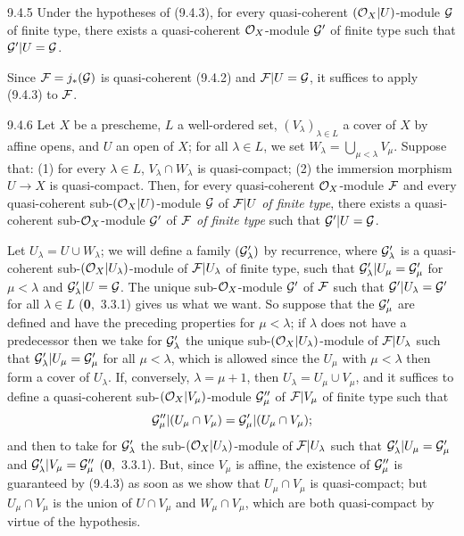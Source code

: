 \documentclass[../main.tex]{subfiles}
\begin{document}
 \begin{env}[Corollary]{9.4.5}
     Under the hypotheses of (9.4.3), for every quasi-coherent $(\mathcal{O}_X|U)$-module $\mathcal{G}$ of finite type, there exists a quasi-coherent $\mathcal{O}_X$-module $\mathcal{G}'$ of finite type such that $\mathcal{G}'|U=\mathcal{G}$.
 \end{env}
 
 Since $\mathcal{F}=j_*(\mathcal{G})$ is quasi-coherent (9.4.2) and $\mathcal{F}|U=\mathcal{G}$, it suffices to apply (9.4.3) to $\mathcal{F}$.
 
 \begin{env}[Lemma]{9.4.6}
     Let $X$ be a prescheme, $L$ a well-ordered set, $(V_\lambda)_{\lambda\in L}$ a cover of $X$ by affine opens, and $U$ an open of $X$; for all $\lambda\in L$, we set $W_\lambda=\bigcup_{\mu<\lambda}V_\mu$.
     Suppose that: (1) for every $\lambda\in L$, $V_\lambda\cap W_\lambda$ is quasi-compact; (2) the immersion morphism $U\to X$ is quasi-compact.
     Then, for every quasi-coherent $\mathcal{O}_X$-module $\mathcal{F}$ and every quasi-coherent sub-$(\mathcal{O}_X|U)$-module $\mathcal{G}$ of $\mathcal{F}|U$ \emph{of finite type}, there exists a quasi-coherent sub-$\mathcal{O}_X$-module $\mathcal{G}'$ of $\mathcal{F}$ \emph{of finite type} such that $\mathcal{G}'|U=\mathcal{G}$.
 \end{env}
 
 Let $U_\lambda=U\cup W_\lambda$; we will define a family $(\mathcal{G}'_\lambda)$ by recurrence, where $\mathcal{G}'_\lambda$ is a quasi-coherent sub-$(\mathcal{O}_X|U_\lambda)$-module of $\mathcal{F}|U_\lambda$ of finite type, such that $\mathcal{G}'_\lambda|U_\mu=\mathcal{G}'_\mu$ for $\mu<\lambda$ and $\mathcal{G}'_\lambda|U=\mathcal{G}$.
 The unique sub-$\mathcal{O}_X$-module $\mathcal{G}'$ of $\mathcal{F}$ such that $\mathcal{G}'|U_\lambda=\mathcal{G}'$ for all $\lambda\in L$ (\textbf{0},~3.3.1) gives us what we want.
 So suppose that the $\mathcal{G}'_\mu$ are defined and have the preceding properties for $\mu<\lambda$; if $\lambda$ does not have a predecessor then we take for $\mathcal{G}'_\lambda$ the unique sub-$(\mathcal{O}_X|U_\lambda)$-module of $\mathcal{F}|U_\lambda$ such that $\mathcal{G}'_\lambda|U_\mu=\mathcal{G}'_\mu$ for all $\mu<\lambda$, which is allowed since the $U_\mu$ with $\mu<\lambda$ then form a cover of $U_\lambda$.
 If, conversely, $\lambda=\mu+1$, then $U_\lambda=U_\mu\cup V_\mu$, and it suffices to define a quasi-coherent sub-$(\mathcal{O}_X|V_\mu)$-module $\mathcal{G}''_\mu$ of $\mathcal{F}|V_\mu$ of finite type such that
 \begin{equation*}
     \mathcal{G}''_\mu|(U_\mu\cap V_\mu)=\mathcal{G}'_\mu|(U_\mu\cap V_\mu);
 \end{equation*}
and then to take for $\mathcal{G}'_\lambda$ the sub-$(\mathcal{O}_X|U_\lambda)$-module of $\mathcal{F}|U_\lambda$ such that $\mathcal{G}'_\lambda|U_\mu=\mathcal{G}'_\mu$ and $\mathcal{G}'_\lambda|V_\mu=\mathcal{G}''_\mu$ (\textbf{0},~3.3.1).
But, since $V_\mu$ is affine, the existence of $\mathcal{G}''_\mu$ is guaranteed by (9.4.3) as soon as we show that $U_\mu\cap V_\mu$ is quasi-compact; but $U_\mu\cap V_\mu$ is the union of $U\cap V_\mu$ and $W_\mu\cap V_\mu$, which are both quasi-compact by virtue of the hypothesis.
\end{document}
